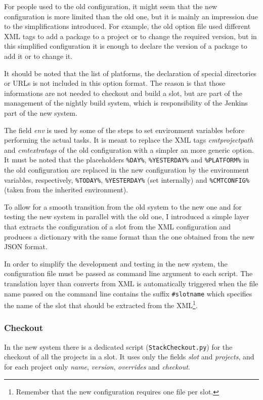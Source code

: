 \documentclass{lhcbnote}
\begin{document}
For people used to the old configuration, it might seem that the new
configuration is more limited than the old one, but it is mainly an impression
due to the simplifications introduced.  For example, the old option file used
different XML tags to add a package to a project or to change the required
version, but in this simplified configuration it is enough to declare the
version of a package to add it or to change it.

It should be noted that the list of platforms, the declaration of special
directories or URLs is not included in this option format.  The reason is that
those informations are not needed to checkout and build a slot, but are part of
the management of the nightly build system, which is responsibility of the
Jenkins part of the new system.

The field \emph{env} is used by some of the steps to set environment variables
before performing the actual tasks.  It is meant to replace the XML tags
\emph{cmtprojectpath} and \emph{cmtextratags} of the old configuration with a
simpler an more generic option.  It must be noted that the placeholders
\texttt{\%DAY\%}, \texttt{\%YESTERDAY\%} and \texttt{\%PLATFORM\%} in the old
configuration are replaced in the new configuration by the environment
variables, respectively, \texttt{\%TODAY\%}, \texttt{\%YESTERDAY\%} (set
internally) and \texttt{\%CMTCONFIG\%} (taken from the inherited environment).

To allow for a smooth transition from the old system to the new one and for
testing the new system in parallel with the old one, I introduced a simple layer
that extracts the configuration of a slot from the XML configuration and
produces a dictionary with the same format than the one obtained from the new
JSON format.

In order to simplify the development and testing in the new system, the
configuration file must be passed as command line argument to each script.  The
translation layer than converts from XML is automatically triggered when the
file name passed on the command line contains the suffix \texttt{\#slotname}
which specifies the name of the slot that should be extracted from the
XML\footnote{%
  Remember that the new configuration requires one file per slot.}.

\subsubsection{Checkout}
\label{CoreTools:CheckOut}
In the new system there is a dedicated script (\texttt{StackCheckout.py}) for
the checkout of all the projects in a slot.  It uses only the fields \emph{slot}
and \emph{projects}, and for each project only \emph{name}, \emph{version},
\emph{overrides} and \emph{checkout}.
\end{document}
